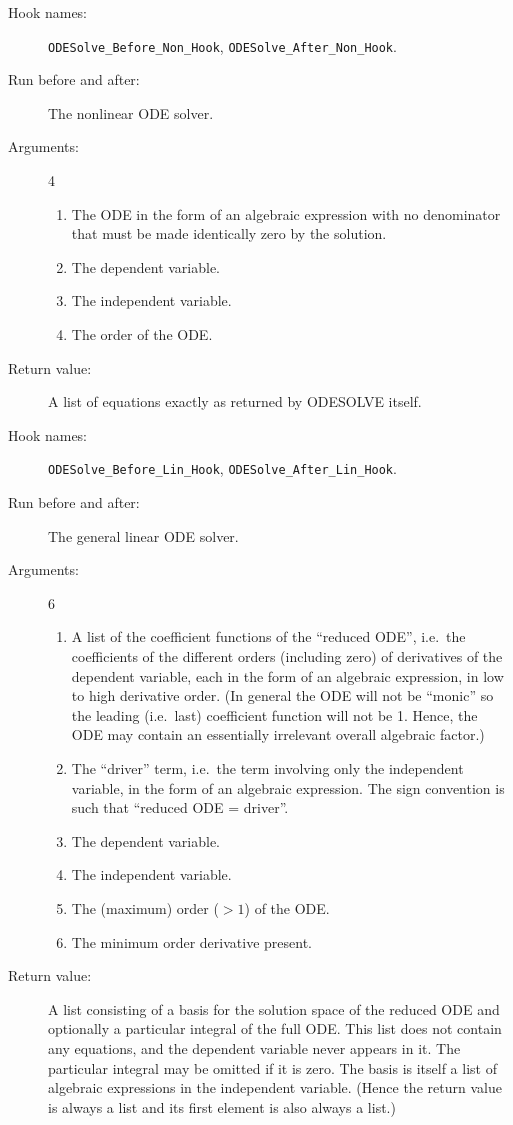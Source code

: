 \begin{description}
\item[Hook names:] \texttt{ODESolve\_Before\_Non\_Hook},
\texttt{ODESolve\_After\_Non\_Hook}.
\item[Run before and after:] The nonlinear ODE solver.
\item[Arguments:] 4
\begin{enumerate}
\item The ODE in the form of an algebraic expression with no
denominator that must be made identically zero by the solution.
\item The dependent variable.
\item The independent variable.
\item The order of the ODE.
\end{enumerate}
\item[Return value:] A list of equations exactly as returned by
ODESOLVE itself.
\end{description}

\noindent\hrulefill
\pagebreak

\begin{description}
\item[Hook names:] \texttt{ODESolve\_Before\_Lin\_Hook},
\texttt{ODESolve\_After\_Lin\_Hook}.
\item[Run before and after:] The general linear ODE solver.
\item[Arguments:] 6
\begin{enumerate}
\item A list of the coefficient functions of the ``reduced ODE'',
i.e.\ the coefficients of the different orders (including zero) of
derivatives of the dependent variable, each in the form of an
algebraic expression, in low to high derivative order.  (In general
the ODE will not be ``monic'' so the leading (i.e.\ last) coefficient
function will not be 1.  Hence, the ODE may contain an essentially
irrelevant overall algebraic factor.)
\item The ``driver'' term, i.e.\ the term involving only the
independent variable, in the form of an algebraic expression.  The
sign convention is such that ``reduced ODE = driver''.
\item The dependent variable.
\item The independent variable.
\item The (maximum) order ($> 1$) of the ODE.
\item The minimum order derivative present.
\end{enumerate}
\item[Return value:] A list consisting of a basis for the solution
space of the reduced ODE and optionally a particular integral of the
full ODE\@.  This list does not contain any equations, and the dependent
variable never appears in it.  The particular integral may be omitted
if it is zero.  The basis is itself a list of algebraic expressions in
the independent variable.  (Hence the return value is always a list
and its first element is also always a list.)
\end{description}

